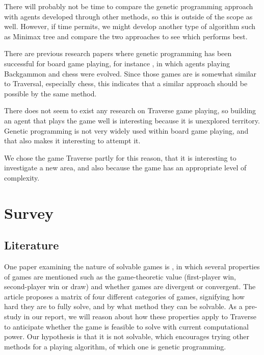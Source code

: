 \documentclass[times, 10pt,twocolumn]{article}
\begin{document}
There will probably not be time to compare the genetic programming approach with agents developed through other methods, so this is outside of the scope as well. However, if time permits, we might develop another type of algorithm such as Minimax tree and compare the two approaches to see which performs best.


There are previous research papers where genetic programming has been successful for board game playing, for instance \cite{human-competitive_gp}, in which agents playing Backgammon and chess were evolved. Since those games are is somewhat similar to Traversal, especially chess, this indicates that a similar approach should be possible by the same method.


There does not seem to exist any research on Traverse game playing, so building an agent that plays the game well is interesting because it is unexplored territory. Genetic programming is not very widely used within board game playing, and that also makes it interesting to attempt it.

We chose the game Traverse partly for this reason, that it is interesting to investigate a new area, and also because the game has an appropriate level of complexity.

\section{Survey}

\subsection{Literature}
One paper examining the nature of solvable games is \cite{games_solved}, in which several properties of games are mentioned such as the game-theoretic value (first-player win, second-player win or draw) and whether games are divergent or convergent. The article proposes a matrix of four different categories of games, signifying how hard they are to fully solve, and by what method they can be solvable. As a pre-study in our report, we will reason about how these properties apply to Traverse to anticipate whether the game is feasible to solve with current computational power. Our hypothesis is that it is not solvable, which encourages trying other methods for a playing algorithm, of which one is genetic programming.
\end{document}

